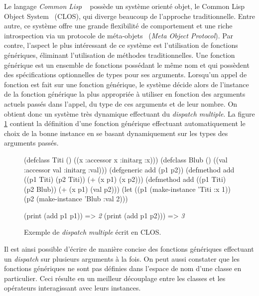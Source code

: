 \documentclass[12pt,twoside,letterpaper,francais]{book}
\newcommand{\clisp}{{\textit{Common Lisp }}}
\newcommand{\schemeresult}[1]{{\it #1}}
\begin{document}
\FloatBarrier

Le langage \clisp~\cite{CLISP} possède un système orienté objet, le
Common Lisp Object System~\cite{CLOS} (CLOS), qui diverge beaucoup de
l'approche traditionnelle. Entre autre, ce système offre une grande
flexibilité de comportement et une riche introspection via un
protocole de méta-objets~\cite{MOP} (\textit{Meta Object
  Protocol}). Par contre, l'aspect le plus intéressant de ce système
est l'utilisation de fonctions génériques, éliminant l'utilisation de
méthodes traditionnelles. Une fonction générique est un ensemble de
fonctions possédant le même nom et qui possèdent des spécifications
optionnelles de types pour ses arguments. Lorsqu'un appel de fonction
est fait sur une fonction générique, le système décide alors de
l'instance de la fonction générique la plus appropriée à utiliser en
fonction des arguments actuels passés dans l'appel, du type de ces
arguments et de leur nombre. On obtient donc un système très dynamique
effectuant du \textit{dispatch multiple}. La figure \ref{OO:CLOS_ex}
contient la définition d'une fonction générique effectuant
automatiquement le choix de la bonne instance en se basant
dynamiquement sur les types des arguments passés.

\begin{figure}[h!]
  \begin{schemecode}
(defclass Titi () ((x :accessor x :initarg :x)))
(defclass Blub () ((val :accessor val :initarg :val)))
(defgeneric add (p1 p2))
(defmethod add ((p1 Titi) (p2 Titi)) (+ (x p1) (x p2)))
(defmethod add ((p1 Titi) (p2 Blub)) (+ (x p1) (val p2)))
(let ((p1 (make-instance 'Titi :x 1))
      (p2 (make-instance 'Blub :val 2)))

  (print (add p1 p1))  => \schemeresult{2}
  (print (add p1 p2))) => \schemeresult{3}
  \end{schemecode}
  \caption{Exemple de \textit{dispatch multiple} écrit en CLOS.}
  \label{OO:CLOS_ex}
\end{figure}

Il est ainsi possible d'écrire de manière concise des fonctions
génériques effectuant un \textit{dispatch} sur plusieurs arguments à
la fois. On peut aussi constater que les fonctions génériques ne sont
pas définies dans l'espace de nom d'une classe en particulier. Ceci
résulte en un meilleur découplage entre les classes et les opérateurs
interagissant avec leurs instances.
\end{document}
